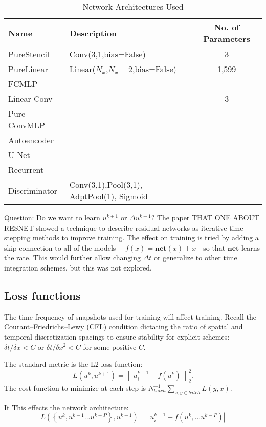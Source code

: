 \documentclass{article}
\begin{document}
\begin{table}
  \caption{\label{tab:network}Network Architectures Used}
  \begin{tabular}{llc}
    \toprule
    Name & Description & No. of Parameters \\
    \midrule
    PureStencil & Conv(3,1,bias=False) & 3 \\
    PureLinear & Linear($N_x$,$N_x-2$,bias=False) & 1,599 \\
    FCMLP & & \\
    Linear Conv & & 3 \\
    Pure-ConvMLP & &  \\
    Autoencoder & & \\
    U-Net & &  \\
    Recurrent & & \\
    \midrule
    Discriminator & Conv(3,1),Pool(3,1), AdptPool(1), Sigmoid & \\
    \bottomrule
  \end{tabular}
\end{table}

Question: Do we want to learn $u^{k+1}$ or $\Delta u^{k+1}$?
The paper THAT ONE ABOUT RESNET showed a technique to describe residual networks as iterative time stepping methods to improve training. The effect on training is tried by adding a skip connection to all of the models--- $f(x)=\mathbf{net}(x)+x$---so that $\mathbf{net}$ learns the rate. This would further allow changing $\Delta t$ or generalize to other time integration schemes, but this was not explored.

\subsection{Loss functions}
The time frequency of snapshots used for training will affect training.
Recall the Courant–Friedrichs–Lewy (CFL) condition dictating the ratio
of spatial and temporal discretization spacings to ensure stability
for explicit schemes: $\delta t / \delta x < C$ or $\delta t / \delta
x^2<C$ for some positive $C$.

The standard metric is the L2 loss function:
\begin{equation}
L\left(u^k,u^{k+1}\right) = \left\| u^{k+1}_i-f(u^k) \right\|_2^2.
\end{equation}
The cost function to minimize at each step is $N_{batch}^{-1}\sum_{x,y\in batch} L(y,x)$.

It This effects the network architecture:
\begin{equation}
L\left(\left\{u^k,u^{k-1}...u^{k-P}\right\},u^{k+1}\right) = \left| u^{k+1}_i-f(u^k,...u^{k-P}) \right|
\end{equation}
\end{document}
